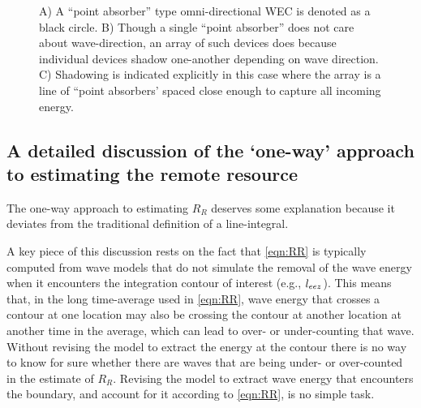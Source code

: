 \begin{figure}[ht]
    \centering
    \caption{A) A ``point absorber'' type omni-directional WEC is denoted as a black circle. B) Though a single ``point absorber'' does not care about wave-direction, an array of such devices does because individual devices shadow one-another depending on wave direction. C) Shadowing is indicated explicitly in this case where the array is a line of ``point absorbers' spaced close enough to capture all incoming energy.}
    \label{fig:omni-dir}
\end{figure}

\subsection{A detailed discussion of the `one-way' approach to estimating the remote resource}

The one-way approach to estimating $R_R$ deserves some explanation because it deviates from the traditional definition of a line-integral.

A key piece of this discussion rests on the fact that \eqref{eqn:RR} is typically computed from wave models that do not simulate the removal of the wave energy when it encounters the integration contour of interest (e.g., $l_{eez}$). This means that, in the long time-average used in \eqref{eqn:RR}, wave energy that crosses a contour at one location may also be crossing the contour at another location at another time in the average, which can lead to over- or under-counting that wave. Without revising the model to extract the energy at the contour there is no way to know for sure whether there are waves that are being under- or over-counted in the estimate of $R_R$. Revising the model to extract wave energy that encounters the boundary, and account for it according to \eqref{eqn:RR}, is no simple task.

